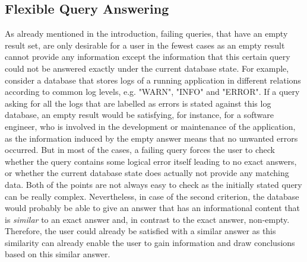 

\subsection{Flexible Query Answering}
\label{sec:meth_fqa}

As already mentioned in the introduction, failing queries, that have an empty result set, are only desirable for a user in the fewest cases as an empty
result cannot provide any information except the information that this certain query could not be answered exactly under the current database state. For
example, consider a database that stores logs of a running application in different relations according to common log levels, e.g. "WARN", "INFO" and
"ERROR". If a query asking for all the logs that are labelled as errors is stated against this log database, an empty result would be satisfying, for 
instance, for a software engineer, who is involved in the development or maintenance of the application, as the information induced by the empty answer 
means that no unwanted errors occurred. But in most of the cases, a failing query forces the user to check whether the query contains some logical error
itself leading to no exact answers, or whether the current database state does actually not provide any matching data. Both of the points are not always
easy to check as the initially stated query can be really complex. Nevertheless, in case of the second criterion, the database would probably be able to
give an answer that has an informational content that is \emph{similar} to an exact answer and, in contrast to the exact answer, non-empty. Therefore, the
user could already be satisfied with a similar answer as this similarity can already enable the user to gain information and draw conclusions based on this
similar answer.

\begin{exmp}
\label{sec:meth_fqa_exmp}

\end{exmp}